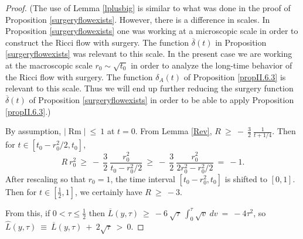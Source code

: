 \documentclass[12pt]{amsart}
\newcommand{\Rm}{\operatorname{Rm}}
\numberwithin{equation}{section}
\theoremstyle{plain}
\theoremstyle{definition}
\theoremstyle{remark}
\begin{document}
\begin{proof}
(The use of Lemma \ref{lplusbig} is similar
to what was done in the proof of Proposition \ref{surgeryflowexists}.
However, there is a difference in scales.  In Proposition
\ref{surgeryflowexists} one was working at a microscopic scale
in order to construct the Ricci flow with surgery. The function
$\overline{\delta}(t)$ in Proposition \ref{surgeryflowexists} was relevant
to this scale. In the present
case we are working at the macroscopic scale $r_0 \sim \sqrt{t_0}$ in
order to analyze the long-time behavior of the Ricci flow with
surgery.  The function $\delta_A(t)$ of Proposition
\ref{propII.6.3} is relevant to this scale.  Thus we will end up further
reducing the surgery function $\overline{\delta}(t)$ of Proposition \ref{surgeryflowexists}
in order to be able to apply Proposition \ref{propII.6.3}.)


By assumption,
$|\Rm| \: \le \: 1$ at $t = 0$.
From Lemma \ref{Rev}, $R \: \ge \: - \: \frac32 \: \frac{1}{t+1/4}$. 
Then for $t \in [t_0 - r_0^2/2, t_0]$, 
\begin{equation}
R \: r_0^2 \: \ge \: - \: \frac32 \: \frac{r_0^2}{t_0 - r_0^2/2}
\: \ge \: - \: \frac32 \: \frac{r_0^2}{2r_0^2 - r_0^2/2} \: = \: -1.
\end{equation}
After rescaling so that $r_0 = 1$, the time interval
$[t_0 - r_0^2, t_0]$ is shifted to $[0, 1]$.
Then for $t \in [\frac12, 1]$, we certainly have
$R \: \ge \: -3$.

From this, if $0 < \tau \le \frac12$ then 
$\overline{L}(y, \tau) \: \ge \: - 6 \: \sqrt{\tau} \:
\int_0^\tau \sqrt{v} \: dv \: = \: - 4 \tau^2$, so
$\hat{L}(y, \tau) \: \equiv \: \overline{L}(y, \tau) \: + \: 2 \sqrt{\tau}
\: > \: 0$.


\end{proof}
\end{document}
